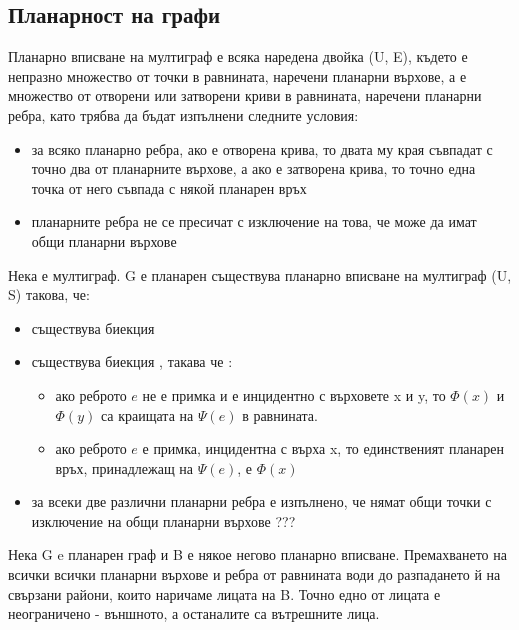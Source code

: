 \subsection{Планарност на графи}
\begin{definition}
    Планарно вписване на мултиграф е всяка наредена двойка (U, E), където  е 
    непразно множество от точки в равнината, наречени планарни върхове, а  е 
    множество от отворени или затворени криви в равнината, наречени планарни ребра, като трябва да бъдат 
    изпълнени следните условия:
    \begin{itemize}
        \item за всяко планарно ребра, ако е отворена крива, то двата му края съвпадат с точно два от 
        планарните върхове, а ако е затворена крива, то точно една точка от него съвпада с някой планарен връх
        \item планарните ребра не се пресичат с изключение на това, че може да имат общи планарни върхове
    \end{itemize}
\end{definition}

\begin{definition}
    Нека \graf е мултиграф. G е планарен \totw съществува планарно вписване на мултиграф (U, S) такова, че:
    \begin{itemize}
        \item съществува биекция 
        \item съществува биекция , такава че :
        \begin{itemize}
            \item ако реброто \(e\) не е примка и е инцидентно с върховете x и y, то \(\Phi(x)\) и 
            \(\Phi(y)\) са краищата на \(\Psi(e)\) в равнината.
            \item ако реброто \(e\) е примка, инцидентна с върха x, то единственият планарен връх, 
            принадлежащ на \(\Psi(e)\), е \(\Phi(x)\)
        \end{itemize}
        \item за всеки две различни планарни ребра е изпълнено, че нямат общи точки с изключение на 
        общи планарни върхове ???
    \end{itemize}
\end{definition}

\begin{definition}
    Нека G e планарен граф и B е някое негово планарно вписване. Премахването на всички всички планарни 
    върхове и ребра от равнината води до разпадането й на свързани райони, които наричаме лицата на B. 
    Точно едно от лицата е неограничено - външното, а останалите са вътрешните лица.
\end{definition}

